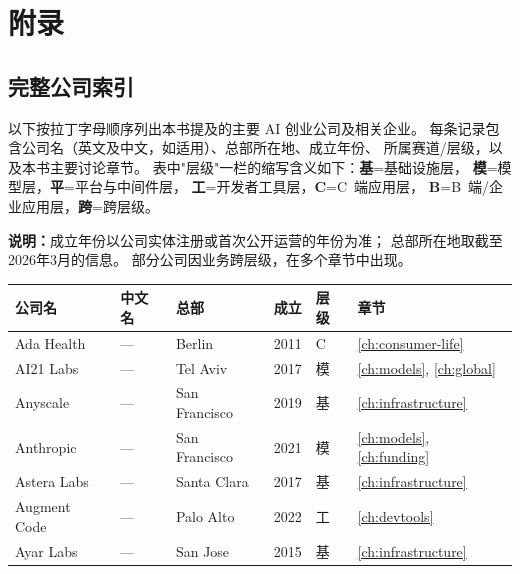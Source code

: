 \chapter{附录}
\label{ch:appendix}



\section{完整公司索引}
\label{sec:appendix-index}

以下按拉丁字母顺序列出本书提及的主要 AI 创业公司及相关企业。
每条记录包含公司名（英文及中文，如适用）、总部所在地、成立年份、
所属赛道/层级，以及本书主要讨论章节。
表中"层级"一栏的缩写含义如下：\textbf{基}=基础设施层，
\textbf{模}=模型层，\textbf{平}=平台与中间件层，
\textbf{工}=开发者工具层，\textbf{C}=C~端应用层，
\textbf{B}=B~端/企业应用层，\textbf{跨}=跨层级。

\medskip

\noindent
\textbf{说明：}成立年份以公司实体注册或首次公开运营的年份为准；
总部所在地取截至2026年3月的信息。
部分公司因业务跨层级，在多个章节中出现。

\bigskip

\nopagebreak
\begin{tabularx}{\textwidth}{@{}l X l l l l@{}}
\toprule
\rowcolor{figLightGray}
\textbf{公司名} & \textbf{中文名} & \textbf{总部} & \textbf{成立} & \textbf{层级} & \textbf{章节} \\
\midrule
Ada Health          & ---             & Berlin        & 2011 & C    & \ref{ch:consumer-life} \\
AI21 Labs           & ---             & Tel Aviv      & 2017 & 模   & \ref{ch:models}, \ref{ch:global} \\
Anyscale            & ---             & San Francisco & 2019 & 基   & \ref{ch:infrastructure} \\
Anthropic           & ---             & San Francisco & 2021 & 模   & \ref{ch:models}, \ref{ch:funding} \\
Astera Labs         & ---             & Santa Clara   & 2017 & 基   & \ref{ch:infrastructure} \\
Augment Code        & ---             & Palo Alto     & 2022 & 工   & \ref{ch:devtools} \\
Ayar Labs           & ---             & San Jose      & 2015 & 基   & \ref{ch:infrastructure} \\
\bottomrule
\end{tabularx}

